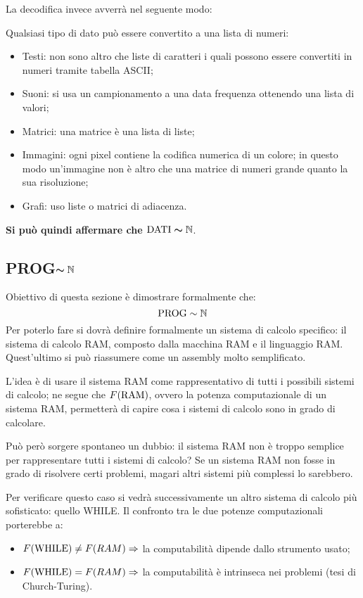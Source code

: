 La decodifica invece avverrà nel seguente modo:
\begin{figure}[H]
    \centering
    
\end{figure}

Qualsiasi tipo di dato può essere convertito a una lista di numeri:
\begin{itemize}
    \item Testi: non sono altro che liste di caratteri i quali possono essere convertiti
        in numeri tramite tabella ASCII;
    \item Suoni: si usa un campionamento a una data frequenza ottenendo una lista di
        valori;
    \item Matrici: una matrice è una lista di liste;
    \item Immagini: ogni pixel contiene la codifica numerica di un colore; in questo modo
    un'immagine non è altro che una matrice di numeri grande quanto la sua risoluzione;
    \item Grafi: uso liste o matrici di adiacenza.
\end{itemize}

\textbf{Si può quindi affermare che $\bm{\text{DATI}\sim\mathbb{N}}$}.

\subsection{\texorpdfstring{PROG$\bm{\sim\mathbb{N}}$}{PROG~N}}
Obiettivo di questa sezione è dimostrare formalmente che:
$$ \text{PROG} \sim \mathbb{N} $$
Per poterlo fare si dovrà definire formalmente un sistema di calcolo specifico: il sistema 
di calcolo RAM, composto dalla macchina RAM e il linguaggio RAM. Quest'ultimo si può 
riassumere come un assembly molto semplificato.

L'idea è di usare il sistema RAM come rappresentativo di tutti i possibili sistemi di calcolo;
ne segue che $F(\text{RAM})$, ovvero la potenza computazionale di un sistema RAM, permetterà
di capire cosa i sistemi di calcolo sono in grado di calcolare.

Può però sorgere spontaneo un dubbio: il sistema RAM non è troppo semplice per rappresentare
tutti i sistemi di calcolo? Se un sistema RAM non fosse in grado di risolvere
certi problemi, magari altri sistemi più complessi lo sarebbero.

Per verificare questo caso si vedrà successivamente un altro sistema di calcolo più
sofisticato: quello WHILE. Il confronto tra le due potenze computazionali porterebbe a:
\begin{itemize}
    \item $F(\text{WHILE})\neq F(RAM) \Rightarrow$ la computabilità dipende dallo strumento usato;
    \item $F(\text{WHILE})=F(RAM) \Rightarrow$ la computabilità è intrinseca nei problemi 
        (tesi di Church-Turing).
\end{itemize}

